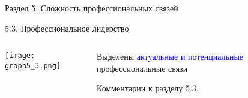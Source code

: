 \begin{frame}{Раздел 5. Сложность профессиональных связей}

{\large 5.3. Профессиональное лидерство}

\begin{columns}[T] %
\begin{column}{0.7\textwidth} %
\centering
          \texttt{[image: graph5\_3.png]}
\end{column}
\begin{column}{0.3\textwidth} %

\small
Выделены \textcolor{blue}{актуальные и потенциальные} профессиональные связи

Комментарии к разделу 5.3.

\end{column}
\end{columns}
\end{frame}


